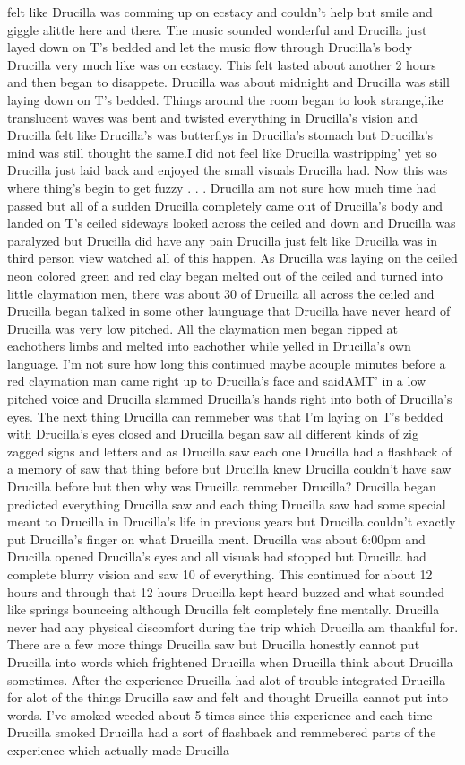 \documentclass[12pt]{book}
\begin{document}
felt like Drucilla was comming up on ecstacy and couldn't help but smile and giggle alittle here and there. The music sounded wonderful and Drucilla just layed down on T's bedded and let the music flow through Drucilla's body Drucilla very much like was on ecstacy. This felt lasted about another 2 hours and then began to disappete. Drucilla was about midnight and Drucilla was still laying down on T's bedded. Things around the room began to look strange,like translucent waves was bent and twisted everything in Drucilla's vision and Drucilla felt like Drucilla's was butterflys in Drucilla's stomach but Drucilla's mind was still thought the same.I did not feel like Drucilla wastripping' yet so Drucilla just laid back and enjoyed the small visuals Drucilla had. Now this was where thing's begin to get fuzzy . . .  Drucilla am not sure how much time had passed but all of a sudden Drucilla completely came out of Drucilla's body and landed on T's ceiled sideways looked across the ceiled and down and Drucilla was paralyzed but Drucilla did have any pain Drucilla just felt like Drucilla was in third person view watched all of this happen. As Drucilla was laying on the ceiled neon colored green and red clay began melted out of the ceiled and turned into little claymation men, there was about 30 of Drucilla all across the ceiled and Drucilla began talked in some other launguage that Drucilla have never heard of Drucilla was very low pitched. All the claymation men began ripped at eachothers limbs and melted into eachother while yelled in Drucilla's own language. I'm not sure how long this continued maybe acouple minutes before a red claymation man came right up to Drucilla's face and saidAMT' in a low pitched voice and Drucilla slammed Drucilla's hands right into both of Drucilla's eyes. The next thing Drucilla can remmeber was that I'm laying on T's bedded with Drucilla's eyes closed and Drucilla began saw all different kinds of zig zagged signs and letters and as Drucilla saw each one Drucilla had a flashback of a memory of saw that thing before but Drucilla knew Drucilla couldn't have saw Drucilla before but then why was Drucilla remmeber Drucilla? Drucilla began predicted everything Drucilla saw and each thing Drucilla saw had some special meant to Drucilla in Drucilla's life in previous years but Drucilla couldn't exactly put Drucilla's finger on what Drucilla ment. Drucilla was about 6:00pm and Drucilla opened Drucilla's eyes and all visuals had stopped but Drucilla had complete blurry vision and saw 10 of everything. This continued for about 12 hours and through that 12 hours Drucilla kept heard buzzed and what sounded like springs bounceing although Drucilla felt completely fine mentally. Drucilla never had any physical discomfort during the trip which Drucilla am thankful for. There are a few more things Drucilla saw but Drucilla honestly cannot put Drucilla into words which frightened Drucilla when Drucilla think about Drucilla sometimes. After the experience Drucilla had alot of trouble integrated Drucilla for alot of the things Drucilla saw and felt and thought Drucilla cannot put into words. I've smoked weeded about 5 times since this experience and each time Drucilla smoked Drucilla had a sort of flashback and remmebered parts of the experience which actually made Drucilla 
\end{document}
